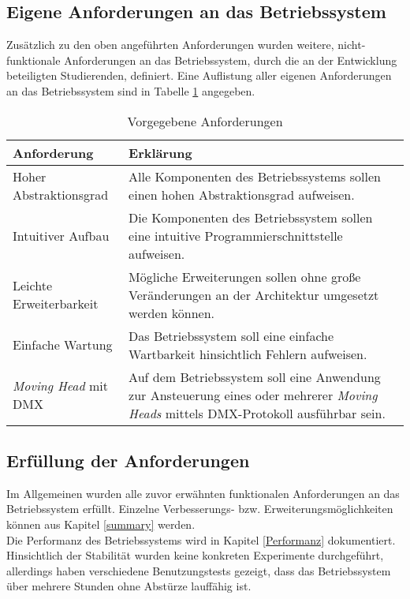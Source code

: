 \subsection{Eigene Anforderungen an das Betriebssystem}
Zusätzlich zu den oben angeführten Anforderungen wurden weitere, nicht-funktionale Anforderungen an das Betriebssystem, durch die an der Entwicklung beteiligten Studierenden, definiert. Eine Auflistung aller eigenen Anforderungen an das Betriebssystem sind in Tabelle \ref{table:Own-Requirements} angegeben.

\begin{table}[H]
\begin{tabular}{ p{5cm}| p{9cm} }
  \textbf{Anforderung} & \textbf{Erklärung} \\ 
  \hline
  Hoher Abstraktionsgrad & Alle Komponenten des Betriebssystems sollen einen hohen Abstraktionsgrad aufweisen. \\
  Intuitiver Aufbau & Die Komponenten des Betriebssystem sollen eine intuitive Programmierschnittstelle aufweisen. \\
  Leichte Erweiterbarkeit & Mögliche Erweiterungen sollen ohne große Veränderungen an der Architektur umgesetzt werden können. \\
  Einfache Wartung & Das Betriebssystem soll eine einfache Wartbarkeit hinsichtlich Fehlern aufweisen. \\
  \textit{Moving Head} mit \ac{DMX} & Auf dem Betriebssystem soll eine Anwendung zur Ansteuerung eines oder mehrerer \textit{Moving Heads} mittels \ac{DMX}-Protokoll ausführbar sein. \\
 \end{tabular}
 \caption{Vorgegebene Anforderungen}
 \label{table:Own-Requirements}
\end{table}

\subsection{Erfüllung der Anforderungen}
Im Allgemeinen wurden alle zuvor erwähnten funktionalen Anforderungen an das Betriebssystem erfüllt. Einzelne Verbesserungs- bzw. Erweiterungsmöglichkeiten können aus Kapitel \ref{summary} werden. \\
Die Performanz des Betriebssystems wird in Kapitel \ref{Performanz} dokumentiert.
Hinsichtlich der Stabilität wurden keine konkreten Experimente durchgeführt, allerdings haben verschiedene Benutzungstests gezeigt, dass das Betriebssystem über mehrere Stunden ohne Abstürze lauffähig ist.

\pagebreak 